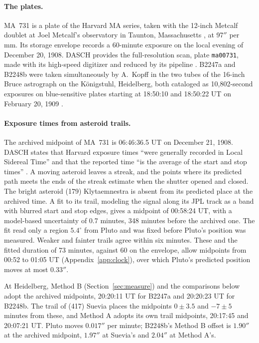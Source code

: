 \documentclass[11pt]{article}
\begin{document}
\paragraph{The plates.}
MA~731 is a plate of the Harvard MA series, taken with the 12-inch Metcalf doublet at Joel Metcalf's observatory in Taunton, Massachusetts \cite{DASCHguide}, at 97$''$ per mm. Its storage envelope records a 60-minute exposure on the local evening of December 20, 1908. DASCH \cite{Grindlay2012,Williams2025} provides the full-resolution scan, plate \texttt{ma00731}, made with its high-speed digitizer \cite{Simcoe2006} and reduced by its pipeline \cite{Laycock2010}. B2247a and B2248b were taken simultaneously by A.~Kopff in the two tubes of the 16-inch Bruce astrograph on the Königstuhl, Heidelberg, both cataloged as 10,802-second exposures on blue-sensitive plates starting at 18:50:10 and 18:50:22 UT on February 20, 1909 \cite{HDAP}.

\paragraph{Exposure times from asteroid trails.}
The archived midpoint of MA~731 is 06:46:36.5 UT on December 21, 1908. DASCH states that Harvard exposure times ``were generally recorded in Local Sidereal Time'' and that the reported time ``is the average of the start and stop times'' \cite{DASCHguide}. A moving asteroid leaves a streak, and the points where its predicted path meets the ends of the streak estimate when the shutter opened and closed. The bright asteroid (179) Klytaemnestra is absent from its predicted place at the archived time. A fit to its trail, modeling the signal along its JPL track as a band with blurred start and stop edges, gives a midpoint of 00:58:24 UT, with a model-based uncertainty of 0.7 minutes, 348 minutes before the archived one. The fit read only a region $5.4^\circ$ from Pluto and was fixed before Pluto's position was measured. Weaker and fainter trails agree within six minutes. These and the fitted duration of 73 minutes, against 60 on the envelope, allow midpoints from 00:52 to 01:05 UT (Appendix~\ref{app:clock}), over which Pluto's predicted position moves at most $0.33''$.

At Heidelberg, Method B (Section~\ref{sec:measure}) and the comparisons below adopt the archived midpoints, 20:20:11 UT for B2247a and 20:20:23 UT for B2248b. The trail of (417) Suevia places the midpoints $0\pm3.5$ and $-7\pm5$ minutes from these, and Method A adopts its own trail midpoints, 20:17:45 and 20:07:21 UT. Pluto moves $0.017''$ per minute; B2248b's Method B offset is $1.90''$ at the archived midpoint, $1.97''$ at Suevia's and $2.04''$ at Method A's.
\end{document}
